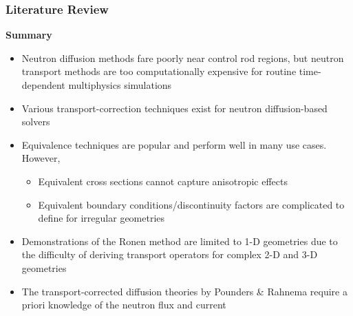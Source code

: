 \begin{frame}
  \frametitle{Literature Review}
  \begin{block}{\textbf{Summary}}
    \begin{itemize}
      \item Neutron diffusion methods fare poorly near control rod regions, but neutron transport
        methods are too computationally expensive for routine time-dependent multiphysics simulations
      \item Various transport-correction techniques exist for neutron diffusion-based solvers
      \item Equivalence techniques are popular and perform well in many use cases. However,
        \begin{itemize}
          \item Equivalent cross sections cannot capture anisotropic effects
          \item Equivalent boundary conditions/discontinuity factors are complicated to define for
            irregular geometries
        \end{itemize}
      \item Demonstrations of the Ronen method are limited to 1-D geometries due to the difficulty of
        deriving transport operators for complex 2-D and 3-D geometries
      \item The transport-corrected diffusion theories by Pounders \& Rahnema require a priori
        knowledge of the neutron flux and current
    \end{itemize}
  \end{block}
\end{frame}
